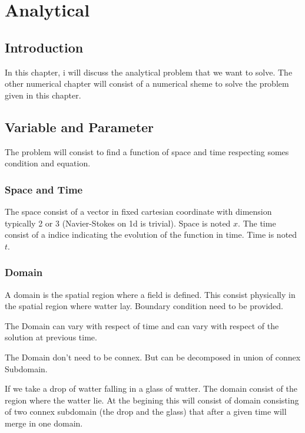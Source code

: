 \chapter{Analytical}
\minitoc
\section{Introduction}
In this chapter, i will discuss the analytical problem that we want to solve.
The other numerical chapter will consist of a numerical sheme to solve the problem given in this chapter.

\section{Variable and Parameter}

The problem will consist to find a function of space and time respecting somes condition and equation.

\subsection{Space and Time}

The space consist of a vector in fixed cartesian coordinate with dimension typically 2 or 3 (Navier-Stokes on 1d is trivial).
Space is noted $x$.
The time consist of a indice indicating the evolution of the function in time.
Time is noted $t$.

\subsection{Domain}

A domain is the spatial region where a field is defined. This consist physically in the spatial region where watter lay.
Boundary condition need to be provided.

The Domain can vary with respect of time and can vary with respect of the solution at previous time.

The Domain don't need to be connex. But can be decomposed in union of connex Subdomain.

\begin{example}
 If we take a drop of watter falling in a glass of watter. The domain consist of the region where the watter lie.
 At the begining this will consist of domain consisting of two connex subdomain (the drop and the glass)
 that after a given time will merge in one domain.
\end{example}

